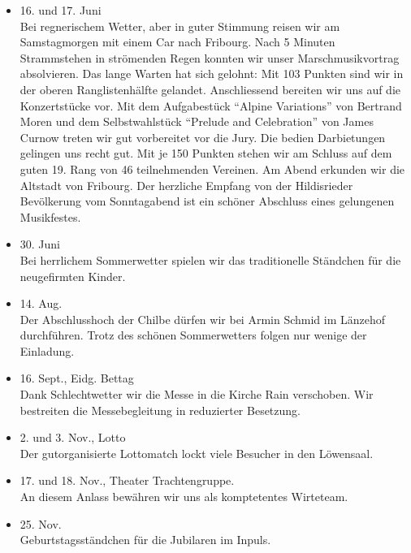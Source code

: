 \begin{history}
\begin{itemize}
        \item 16. und 17. Juni\\
              Bei regnerischem Wetter, aber in guter Stimmung reisen wir am
              Samstagmorgen mit einem Car nach Fribourg. Nach 5 Minuten Strammstehen
              in strömenden Regen konnten wir unser Marschmusikvortrag absolvieren.
              Das lange Warten hat sich gelohnt: Mit 103 Punkten sind wir in der
              oberen Ranglistenhälfte gelandet. Anschliessend bereiten wir uns auf die
              Konzertstücke vor. Mit dem Aufgabestück \enquote{Alpine Variations} von
              Bertrand Moren und dem Selbstwahlstück \enquote{Prelude and Celebration}
              von James Curnow treten wir gut vorbereitet vor die Jury. Die bedien
              Darbietungen gelingen uns recht gut. Mit je 150 Punkten stehen wir am
              Schluss auf dem guten 19. Rang von 46 teilnehmenden Vereinen. Am Abend
              erkunden wir die Altstadt von Fribourg. Der herzliche Empfang von der
              Hildisrieder Bevölkerung vom Sonntagabend ist ein schöner Abschluss
              eines gelungenen Musikfestes.

        \item 30. Juni\\
              Bei herrlichem Sommerwetter spielen wir das traditionelle Ständchen für
              die neugefirmten Kinder.

        \item 14. Aug.\\
              Der Abschlusshoch der Chilbe dürfen wir bei Armin Schmid im Länzehof
              durchführen. Trotz des schönen Sommerwetters folgen nur wenige der
              Einladung.

        \item 16. Sept., Eidg. Bettag\\
              Dank Schlechtwetter wir die Messe in die Kirche Rain verschoben. Wir
              bestreiten die Messebegleitung in reduzierter Besetzung.

        \item 2. und 3. Nov., Lotto\\
              Der gutorganisierte Lottomatch lockt viele Besucher in den Löwensaal.

        \item 17. und 18. Nov., Theater Trachtengruppe.\\
              An diesem Anlass bewähren wir uns  als komptetentes Wirteteam.

        \item 25. Nov.\\
              Geburtstagsständchen für die Jubilaren im Inpuls.


    \end{itemize}

\end{history}
